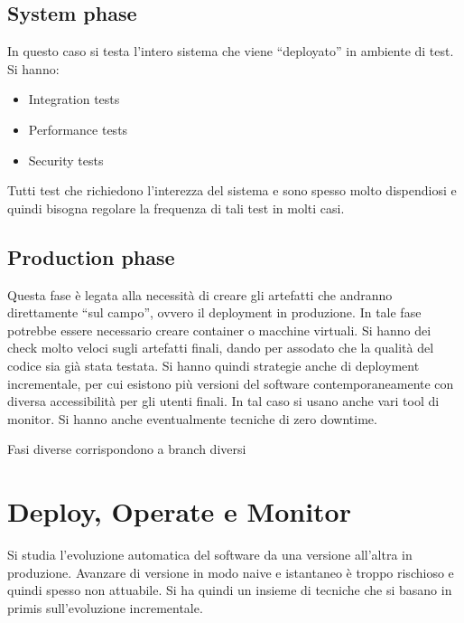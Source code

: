 \subsection{System phase}
In questo caso si testa l'intero sistema che viene “deployato” in ambiente di test.
Si hanno:
\begin{itemize}
      \item Integration tests
      \item Performance tests
      \item Security tests
\end{itemize}
Tutti test che richiedono l'interezza del sistema e sono spesso molto dispendiosi e
quindi bisogna regolare la frequenza di tali test in molti casi.
\subsection{Production phase}
Questa fase è legata alla necessità di creare gli artefatti che andranno
direttamente “sul campo”, ovvero il deployment in produzione. In tale fase potrebbe
essere necessario creare container o macchine virtuali. Si hanno dei check molto
veloci sugli artefatti finali, dando per assodato che la qualità del codice sia già
stata testata. Si hanno quindi strategie anche di deployment incrementale, per
cui esistono più versioni del software contemporaneamente con diversa accessibilità
per gli utenti finali. In tal caso si usano anche vari tool di monitor. Si hanno
anche eventualmente tecniche di zero downtime.

Fasi diverse corrispondono a branch diversi
\section{Deploy, Operate e Monitor}
Si studia l'evoluzione automatica del software da una versione all'altra in
produzione. Avanzare di versione in modo naive e istantaneo è troppo rischioso e
quindi spesso non attuabile. Si ha quindi un insieme di tecniche che si basano
in primis sull'evoluzione incrementale.

